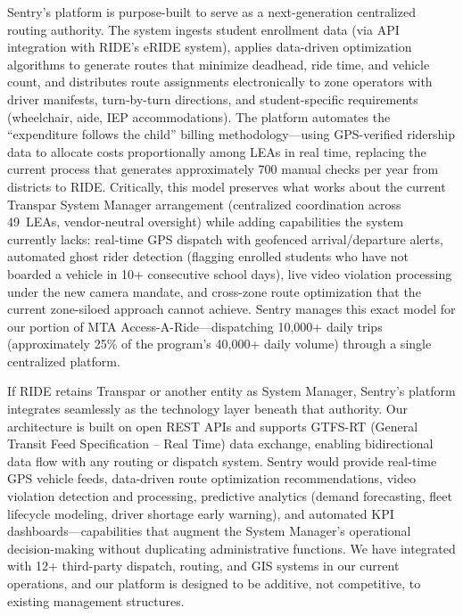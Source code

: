 \begin{description}[style=nextline, leftmargin=0.5cm]
    \item[\faIcon{project-diagram} \textbf{Sentry as the Next-Generation System Manager:}] Sentry's platform is purpose-built to serve as a next-generation centralized routing authority. The system ingests student enrollment data (via API integration with RIDE's eRIDE system), applies data-driven optimization algorithms to generate routes that minimize deadhead, ride time, and vehicle count, and distributes route assignments electronically to zone operators with driver manifests, turn-by-turn directions, and student-specific requirements (wheelchair, aide, IEP accommodations). The platform automates the ``expenditure follows the child'' billing methodology---using GPS-verified ridership data to allocate costs proportionally among LEAs in real time, replacing the current process that generates approximately 700 manual checks per year from districts to RIDE. Critically, this model preserves what works about the current Transpar System Manager arrangement (centralized coordination across 49~LEAs, vendor-neutral oversight) while adding capabilities the system currently lacks: real-time GPS dispatch with geofenced arrival/departure alerts, automated ghost rider detection (flagging enrolled students who have not boarded a vehicle in 10+ consecutive school days), live video violation processing under the new camera mandate, and cross-zone route optimization that the current zone-siloed approach cannot achieve. Sentry manages this exact model for our portion of MTA Access-A-Ride---dispatching 10,000+ daily trips (approximately 25\% of the program's 40,000+ daily volume) through a single centralized platform.

    \item[\faIcon{plug} \textbf{Integration with the Existing Authority:}] If RIDE retains Transpar or another entity as System Manager, Sentry's platform integrates seamlessly as the technology layer beneath that authority. Our architecture is built on open REST APIs and supports GTFS-RT (General Transit Feed Specification -- Real Time) data exchange, enabling bidirectional data flow with any routing or dispatch system. Sentry would provide real-time GPS vehicle feeds, data-driven route optimization recommendations, video violation detection and processing, predictive analytics (demand forecasting, fleet lifecycle modeling, driver shortage early warning), and automated KPI dashboards---capabilities that augment the System Manager's operational decision-making without duplicating administrative functions. We have integrated with 12+ third-party dispatch, routing, and GIS systems in our current operations, and our platform is designed to be additive, not competitive, to existing management structures.


\end{description}
